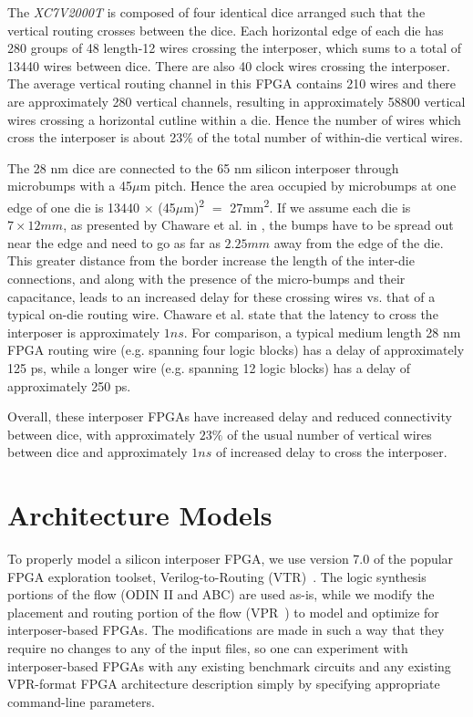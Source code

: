 \documentclass[journal]{IEEEtran}
\begin{document}
The \textit{XC7V2000T} is composed of four identical dice arranged such that the vertical routing crosses between the dice. Each horizontal edge of each die has 280 groups of 48 length-12 wires crossing the interposer, which sums to a total of 13440 wires between dice. There are also 40 clock wires crossing the interposer. The average vertical routing channel in this FPGA contains 210 wires and there are approximately 280 vertical channels, resulting in approximately 58800 vertical wires crossing a horizontal cutline within a die. Hence the number of wires which cross the interposer is about 23\% of the total number of within-die vertical wires.

The 28 nm dice are connected to the 65 nm silicon interposer through microbumps with a 45$\mu$m pitch. Hence the area occupied by microbumps at one edge of one die is 13440 $\times$ (45$\mu$m)\textsuperscript{2} $=$ 27mm\textsuperscript{2}. If we assume each die is $7 \times 12 mm$, as presented by Chaware et al. in \cite{xilinxTSV}, the bumps have to be spread out near the edge and need to go as far as $2.25mm$ away from the edge of the die. This greater distance from the border increase the length of the inter-die connections, and along with the presence of the micro-bumps and their capacitance, leads to an increased delay for these crossing wires vs. that of a typical on-die routing wire. Chaware et al. state that the latency to cross the interposer is approximately $1ns$. For comparison, a typical medium length 28 nm FPGA routing wire (e.g. spanning four logic blocks) has a delay of approximately 125 ps, while a longer wire (e.g. spanning 12 logic blocks) has a delay of approximately 250 ps.

Overall, these interposer FPGAs have increased delay and reduced connectivity between dice, with approximately $23\%$ of the usual number of vertical wires between dice and approximately $1ns$ of increased delay to cross the interposer.

\section{Architecture Models}
\label{archSection}
To properly model a silicon interposer FPGA, we use version 7.0 of the popular FPGA exploration toolset, Verilog-to-Routing (VTR)~\cite{luu2014vtr}. The logic synthesis portions of the flow (ODIN II and  ABC) are used as-is, while we modify the placement and routing portion of the flow (VPR~\cite{betz1997vpr}) to model and optimize for interposer-based FPGAs. The modifications are made in such a way that they require no changes to any of the input files, so one can experiment with interposer-based FPGAs with any existing benchmark circuits and any existing VPR-format FPGA architecture description simply by specifying appropriate command-line parameters.
\end{document}
